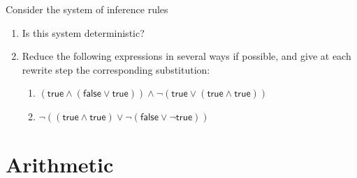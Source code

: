 \documentclass[11pt,a4paper]{article}
\newcommand{\true}{\textsf{true}\xspace}
\newcommand{\false}{\textsf{false}\xspace}
\newcommand\rname[1]{\langle{#1}\rangle}
\begin{document}
Consider the system of inference rules

\begin{enumerate}

  \item Is this system deterministic?

  \item Reduce the following expressions in several ways if possible,
    and give at each rewrite step the corresponding substitution:
  \begin{enumerate}

    \item \((\true \wedge (\false \vee \true)) \wedge \neg(\true \vee
      (\true \wedge \true))\)

    \item \(\neg((\true \wedge \true) \vee \neg(\false \vee \neg\true))\)

  \end{enumerate}

\end{enumerate}


\section{Arithmetic}
\end{document}
